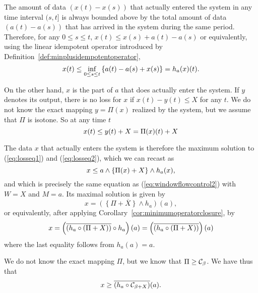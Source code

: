 \begin{figure}[!h]
    \protect{}
\end{figure}

The amount of data $(x(t) - x(s))$ that actually entered the system
in any time interval $(s,t]$ is always
bounded above by the total amount of data $(a(t) - a(s))$  that has
arrived in the system during the same period.
Therefore, for any $0 \leq s \leq t$, $x(t) \leq
x(s) + a(t) - a(s)$ or equivalently, using the linear idempotent operator
introduced by Definition~\ref{def:minplusidempotentoperator},
\begin{equation}
\mylabel{eq:losseq1}
x(t) \leq \inf_{0 \leq s \leq t}
               \left\{ a(t) - a(s) + x(s) \right\} = h_{a}(x)(t).
\end{equation}

On the other hand, $x$ is the part of $a$ that does actually enter
the system. If $y$ denotes its output, there is no loss for $x$ if
$x(t) - y(t) \leq X$ for any $t$. We do not know the exact mapping
$y = \Pi(x)$ realized by the system, but we assume that $\Pi$ is
isotone. So at any time $t$
\begin{equation}
\mylabel{eq:losseq2}
x(t) \leq y(t) + X = \Pi(x)(t) + X
\end{equation}

The data $x$ that actually enters the system is therefore the maximum
solution to (\ref{eq:losseq1}) and (\ref{eq:losseq2}), which we can recast as
\begin{equation}
\mylabel{eq:losseq3}
x \leq a \wedge \left\{ \Pi(x) + X \right\}  \wedge h_{a}(x),
\end{equation}
and which is precisely the same equation as (\ref{eq:windowflowcontrol2}) with $W=X$ and $M = a$.
Its maximal solution is given by
$$x = \overline{ \left( \left\{ \Pi + X \right\}  \wedge h_{a} \right) } (a), $$
or equivalently, after applying Corollary~\ref{cor:minimumoperatorclosure}, by
\begin{equation}
\mylabel{eq:closure-loss-eq}
x = \left( \overline{(h_a \circ (\Pi + X))} \circ h_{a} \right) (a) =  \left( \overline{(h_a \circ (\Pi + X))} \right) (a)
\end{equation}
where the last equality follows from $h_a(a) = a$.

We do not know the exact mapping $\Pi$, but we know that $\Pi \geq \mathcal C_{\beta}$.
We have thus that
\begin{equation}
\mylabel{eq:closure-loss-ineq}
x \geq  \overline{ ( h_{a} \circ \calC_{\beta + X} )}(a).
\end{equation}

